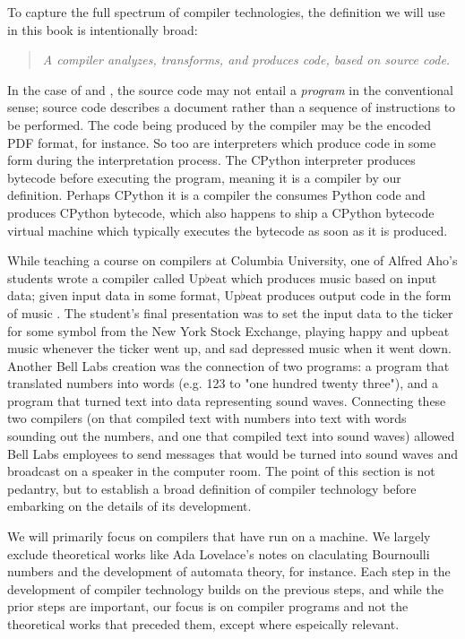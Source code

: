 \vspace{0.5em}

To capture the full spectrum of compiler technologies,
the definition we will use in this book is intentionally broad:
\begin{quotation}
\textit{
    A compiler analyzes, transforms, and produces code, based on source code.
}
\label{def:compiler}
\end{quotation}

In the case of \tex and \metafont, the source code
may not entail a \textit{program} in the conventional sense;
\tex source code describes a document rather than a sequence of
instructions to be performed.
The code being produced by the compiler may be the encoded PDF format, for instance.
So too are interpreters which produce code in some form during the interpretation process.
The CPython interpreter produces bytecode before executing the program,
meaning it is a compiler by our definition.
Perhaps CPython it is a compiler the consumes Python code and produces CPython bytecode,
which also happens to ship a CPython bytecode virtual machine which typically
executes the bytecode as soon as it is produced.

While teaching a course on compilers at Columbia University, one of Alfred Aho's students
wrote a compiler called Up$\flat$eat which produces music based on input data;
given input data in some format, Up$\flat$eat produces output code in the form of music
\cite{aho_oral_history_2022}.
The student's final presentation was to set the input data to the ticker for some symbol
from the New York Stock Exchange, playing happy and upbeat music whenever the ticker went up,
and sad depressed music when it went down.
Another Bell Labs creation was the connection of two programs: a program that translated
numbers into words (e.g. 123 to "one hundred twenty three"), and a program that turned
text into data representing sound waves.
Connecting these two compilers (on that compiled text with numbers into text with words
sounding out the numbers, and one that compiled text into sound waves) allowed
Bell Labs employees to send messages that would be turned into sound waves and broadcast
on a speaker in the computer room.
The point of this section is not pedantry, but to establish a broad definition of
compiler technology before embarking on the details of its development.

We will primarily focus on compilers that have run on a machine.
We largely exclude theoretical works like Ada Lovelace's notes on claculating Bournoulli numbers
and the development of automata theory, for instance.
Each step in the development of compiler technology builds on the previous steps,
and while the prior steps are important, our focus is on compiler programs and not the
theoretical works that preceded them, except where espeically relevant.
